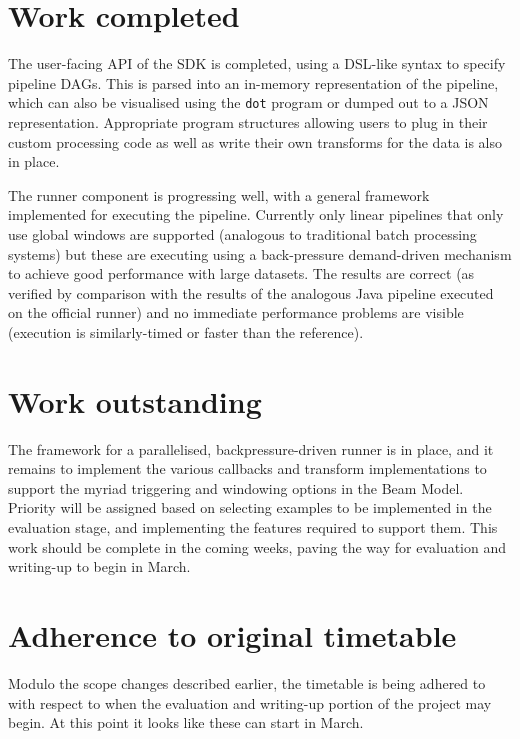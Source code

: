 \documentclass[11pt]{scrartcl}
\begin{document}
\section*{Work completed}
The user-facing API of the SDK is completed, using a DSL-like syntax to specify pipeline DAGs. This is parsed into an in-memory representation of the pipeline, which can also be visualised using the \texttt{dot} program or dumped out to a JSON representation. Appropriate program structures allowing users to plug in their custom processing code as well as write their own transforms for the data is also in place.

The runner component is progressing well, with a general framework implemented for executing the pipeline. Currently only linear pipelines that only use global windows are supported (analogous to traditional batch processing systems) but these are executing using a back-pressure demand-driven mechanism to achieve good performance with large datasets. The results are correct (as verified by comparison with the results of the analogous Java pipeline executed on the official runner) and no immediate performance problems are visible (execution is similarly-timed or faster than the reference).

\section*{Work outstanding}
The framework for a parallelised, backpressure-driven runner is in place, and it remains to implement the various callbacks and transform implementations to support the myriad triggering and windowing options in the Beam Model. Priority will be assigned based on selecting examples to be implemented in the evaluation stage, and implementing the features required to support them. This work should be complete in the coming weeks, paving the way for evaluation and writing-up to begin in March.

\section*{Adherence to original timetable}
Modulo the scope changes described earlier, the timetable is being adhered to with respect to when the evaluation and writing-up portion of the project may begin. At this point it looks like these can start in March.
\end{document}

